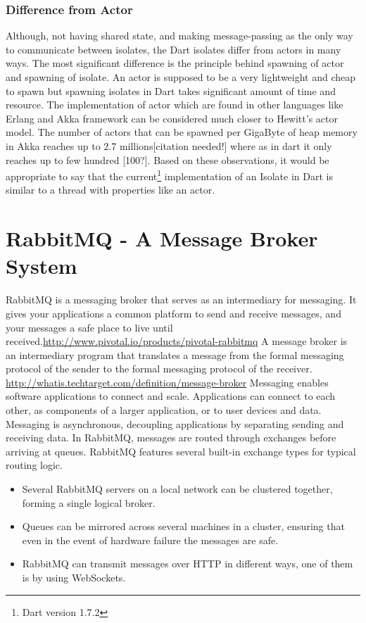   \subsubsection{Difference from Actor}
Although, not having shared state, and making message-passing as the only way to communicate between isolates, the Dart isolates differ from actors in many ways. The most significant difference is the principle behind spawning of actor and spawning of isolate. An actor is supposed to be a very lightweight and cheap to spawn but spawning isolates in Dart takes significant amount of time and resource. The implementation of actor which are found in other languages like Erlang and Akka framework can be considered much closer to Hewitt's actor model. The number of actors that can be spawned per GigaByte of heap memory in Akka reaches up to 2.7 millions[citation needed!] where as in dart it only reaches up to few hundred [100?]. Based on these observations, it would be appropriate to say that the current\footnote{Dart version 1.7.2} implementation of an Isolate in Dart is \textemdash{} similar to a thread with properties like an actor.

\section{RabbitMQ - A Message Broker System}
RabbitMQ is a messaging broker that serves as an intermediary for messaging. It gives your applications a common platform to send and receive messages, and your messages a safe place to live until received.\url{http://www.pivotal.io/products/pivotal-rabbitmq}
A message broker is an intermediary program that translates a message from the formal messaging protocol of the sender to the formal messaging protocol of the receiver. \url{http://whatis.techtarget.com/definition/message-broker}
Messaging enables software applications to connect and scale. Applications can connect to each other, as components of a larger application, or to user devices and data. Messaging is asynchronous, decoupling applications by separating sending and receiving data. In RabbitMQ, messages are routed through exchanges before arriving at queues. RabbitMQ features several built-in exchange types for typical routing logic.\cite{rabbitmqFeatures}
\begin{itemize}
  \item Several RabbitMQ servers on a local network can be clustered together, forming a single logical broker.
  \item Queues can be mirrored across several machines in a cluster, ensuring that even in the event of hardware failure the messages are safe.
  \item RabbitMQ can transmit messages over HTTP in different ways, one of them is by using WebSockets.
\end{itemize}

